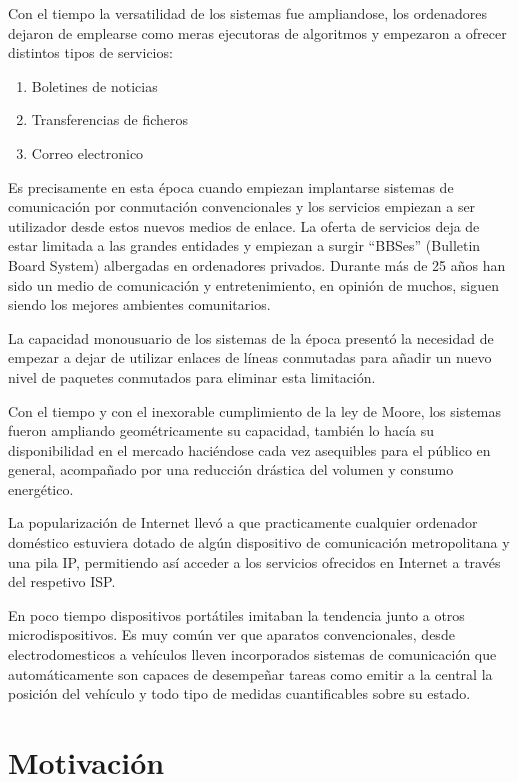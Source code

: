 \documentclass[a4paper,spanish,12pt]{book}
\begin{document}
Con el tiempo la versatilidad de los sistemas fue ampliandose, los ordenadores dejaron de emplearse como meras ejecutoras de algoritmos y empezaron a ofrecer distintos tipos de servicios:
\begin{enumerate}
	\item Boletines de noticias
	\item Transferencias de ficheros
	\item Correo electronico
\end{enumerate}
Es precisamente en esta \'epoca cuando empiezan implantarse sistemas de comunicación por conmutación convencionales y los servicios empiezan a ser utilizador desde estos nuevos medios de enlace. La oferta de servicios deja de estar limitada a las grandes entidades y empiezan a surgir ``BBSes'' (Bulletin Board System) albergadas en ordenadores privados. Durante más de 25 años han sido un medio de comunicación y entretenimiento, en opinión de muchos, siguen siendo los mejores ambientes comunitarios. 

La capacidad monousuario de los sistemas de la \'epoca presentó la necesidad de empezar a dejar de utilizar enlaces de líneas conmutadas para añadir un nuevo nivel de paquetes conmutados para eliminar esta limitación.

Con el tiempo y con el inexorable cumplimiento de la ley de Moore, los sistemas fueron ampliando geom\'etricamente su capacidad, tambi\'en lo hacía su disponibilidad en el mercado haci\'endose cada vez asequibles para el público en general, acompañado por una reducción drástica del volumen y consumo energ\'etico.  

La popularización de Internet llevó a que practicamente cualquier ordenador dom\'estico estuviera dotado de algún dispositivo de comunicación metropolitana y una pila IP, permitiendo así acceder a los servicios ofrecidos en Internet a trav\'es del respetivo ISP. 

En poco tiempo dispositivos portátiles imitaban la tendencia junto a otros microdispositivos. Es muy común ver que aparatos convencionales, desde electrodomesticos a vehículos lleven incorporados sistemas de comunicación que automáticamente son capaces de desempeñar tareas como emitir a la central la posición del vehículo y todo tipo de medidas cuantificables sobre su estado. 

\section{Motivación}
\end{document}
